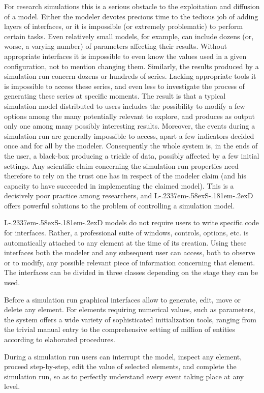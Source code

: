 \documentclass [11pt,a4paper] {book}
\def\LsD{{L\kern-.2337em\lower-.58ex\hbox{S}\kern-.181em\lower-.2ex\hbox{D}}\xspace}
\begin{document}
For research simulations this is a serious obstacle to the exploitation and diffusion of a model. Either the modeler devotes precious time to the tedious job of adding layers of interfaces, or it is impossible (or extremely problematic) to perform certain tasks. Even relatively small models, for example, can include dozens (or, worse, a varying number) of parameters affecting their results. Without appropriate interfaces it is impossible to even know the values used in a given configuration, not to mention changing them. Similarly, the results produced by a simulation run concern dozens or hundreds of series. Lacking appropriate tools it is impossible to access these series, and even less to investigate the process of generating these series at specific moments. The result is that a typical simulation model distributed to users includes the possibility to modify a few options among the many potentially relevant to explore, and produces as output only one among many possibly interesting results. Moreover, the events during a simulation run are generally impossible to access, apart a few indicators decided once and for all by the modeler. Consequently the whole system is, in the ends of the user, a black-box producing a trickle of data, possibly affected by a few initial settings. Any scientific claim concerning the simulation run properties need therefore to rely on the trust one has in respect of the modeler claim (and his capacity to have succeeded in implementing the claimed model). This is a decisively poor practice among researchers, and \LsD offers powerful solutions to the problem of controlling a simulation model.

\LsD models do not require users to write specific code for interfaces. Rather, a professional suite of windows, controls, options, etc. is automatically attached to any element at the time of its creation. Using these interfaces both the modeler and any subsequent user can access, both to observe or to modify, any possible relevant piece of information concerning that element. The interfaces can be divided in three classes depending on the stage they can be used.

Before a simulation run graphical interfaces allow to generate, edit, move or delete any element. For elements requiring numerical values, such as parameters, the system offers a wide variety of sophisticated initialization tools, ranging from the trivial manual entry to the comprehensive setting of million of entities according to elaborated procedures.

During a simulation run users can interrupt the model, inspect any element, proceed step-by-step, edit the value of selected elements, and complete the simulation run, so as to perfectly understand every event taking place at any level.
\end{document}

